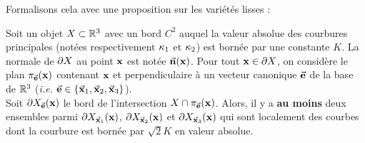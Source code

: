 \noindent Formalisons cela avec une proposition sur les variétés lisses :
%
\begin{proposition}
\label{prop:slices-3d}
  Soit un objet $X \subset \mathbb{R}^3$ avec un bord $C^2$ auquel la valeur
  absolue des courbures principales (notées respectivement $\kappa_{1}$ et
  $\kappa_{2}$) est bornée par une constante $K$. La normale de $\partial X$ au
  point $\mathbf{x}$ est notée $\vec{\mathbf{n}}(\mathbf{x})$. Pour tout $\mathbf{x} \in \partial X$, on
  considère le plan $\pi_{\vec{\mathbf{e}}}(\mathbf{x})$ contenant $\mathbf{x}$ et perpendiculaire à
  un vecteur canonique $\vec{\mathbf{e}}$ de la base de $\mathbb{R}^3$ (\emph{i.e.}
  $\vec{\mathbf{e}}\in\{ \vec{\mathbf{x}}_1, \vec{\mathbf{x}}_2, \vec{\mathbf{x}}_3 \}$).
  \\
  Soit $\partial X_{\vec{\mathbf{e}}}(\mathbf{x})$ le bord de l'intersection $X
  \cap \pi_{\vec{\mathbf{e}}}(\mathbf{x})$. Alors, il y a \textbf{au moins} deux ensembles parmi
  $\partial X_{\vec{\mathbf{x}}_1}(\mathbf{x})$, $\partial X_{\vec{\mathbf{x}}_2}(\mathbf{x})$ et
  $\partial X_{\vec{\mathbf{x}}_3}(\mathbf{x})$ qui sont localement des courbes dont la
  courbure est bornée par $\sqrt{2}K$ en valeur absolue.
\end{proposition}
